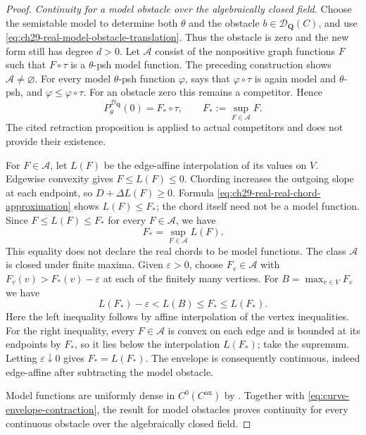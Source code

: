\begin{proof}
\emph{Continuity for a model obstacle over the algebraically closed field.}
Choose the semistable model to determine both $\theta$ and the obstacle
$b\in\mathcal D_{\mathbf Q}(C)$, and use
\eqref{eq:ch29-real-model-obstacle-translation}.  Thus the obstacle is zero
and the new form still has degree $d>0$.
Let $\mathcal A$ consist of the nonpositive graph functions $F$ such
that $F\circ\tau$ is a $\theta$-psh model function.
The preceding construction shows $\mathcal A\ne\varnothing$.
For every model $\theta$-psh function $\varphi$,
\cite[Proposition~3.8]{GJKM19} says that $\varphi\circ\tau$ is again
model and $\theta$-psh, and $\varphi\leq\varphi\circ\tau$.
For an obstacle zero this remains a competitor.  Hence
\begin{equation}
\label{eq:curve-envelope-retraction}
 P^{\mathcal D_{\mathbf Q}}_\theta(0)=F_*\circ\tau,
 \qquad F_*:=\sup_{F\in\mathcal A}F.
\end{equation}
The cited retraction proposition is applied to actual competitors and
does not provide their existence.

For $F\in\mathcal A$, let $L(F)$ be the edge-affine interpolation of
its values on $V$.  Edgewise convexity gives $F\leq L(F)\leq0$.
Chording increases the outgoing slope at each endpoint, so
$D+\Delta L(F)\geq0$.  Formula
\eqref{eq:ch29-real-real-chord-approximation} shows $L(F)\leq F_*$;
the chord itself need not be a model function.
Since \(F\leq L(F)\leq F_*\) for every \(F\in\mathcal A\), we have
\begin{equation}
\label{eq:curve-chord-supremum}
                 F_*=\sup_{F\in\mathcal A}L(F).
\end{equation}
This equality does not declare the real chords to be model functions.
The class $\mathcal A$ is closed under finite maxima.  Given
$\varepsilon>0$, choose $F_v\in\mathcal A$ with
$F_v(v)>F_*(v)-\varepsilon$ at each of the finitely many vertices.
For $B=\max_{v\in V}F_v$ we have
\[
 L(F_*)-\varepsilon<L(B)\leq F_*\leq L(F_*).
\]
Here the left inequality follows by affine interpolation of the vertex
inequalities.  For the right inequality, every $F\in\mathcal A$
is convex on each edge and is bounded at its endpoints by $F_*$, so
it lies below the interpolation $L(F_*)$; take the supremum.
Letting $\varepsilon\downarrow0$ gives $F_*=L(F_*)$.
The envelope is consequently continuous, indeed edge-affine after
subtracting the model obstacle.

Model functions are uniformly dense in $C^0(C^{\mathrm{an}})$ by
\cite[Proposition~2.15]{GM19}.  Together with
\eqref{eq:curve-envelope-contraction}, the result for model
obstacles proves continuity for every continuous obstacle over the
algebraically closed field.


\end{proof}
